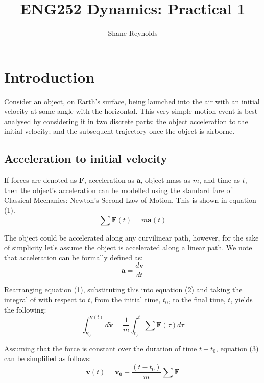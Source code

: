 \documentclass[a4paper]{article}
\begin{document}
\title{ENG252 Dynamics: Practical 1}
\author{Shane Reynolds}
\maketitle

\section{Introduction}
Consider an object, on Earth's surface, being launched into the air with an initial velocity at some angle with the horizontal. This very simple motion event is best analysed by considering it in two discrete parts: the object acceleration to the initial velocity; and the subsequent trajectory once the object is airborne.

\subsection{Acceleration to initial velocity}
If forces are denoted as $\boldsymbol{F}$, acceleration as $\boldsymbol{a}$, object mass as $m$, and time as $t$, then the object's acceleration can be modelled using the standard fare of Classical Mechanics: Newton's Second Law of Motion. This is shown in equation (1).
\begin{equation}
\sum \boldsymbol{F}(t) = m \boldsymbol{a}(t)
\end{equation}

The object could be accelerated along any curvilinear path, however, for the sake of simplicity let's assume the object is accelerated along a linear path. We note that acceleration can be formally defined as:
\begin{equation}
\boldsymbol{a} = \frac{d\boldsymbol{v}}{dt}
\end{equation}

Rearranging equation (1), substituting this into equation (2) and taking the integral of with respect to $t$, from the initial time, $t_0$, to the final time, $t$, yields the following:
\begin{equation}
\int_{\boldsymbol{v_0}}^{\boldsymbol{v}(t)} d\tilde{\boldsymbol{v}} = \frac{1}{m}\int_{t_0}^{t} \sum \boldsymbol{F}(\tau) d\tau
\end{equation}

Assuming that the force is constant over the duration of time $t-t_0$, equation (3) can be simplified as follows:
\begin{equation}
\boldsymbol{v}(t) = \boldsymbol{v_0} + \frac{(t-t_0)}{m} \sum \boldsymbol{F} 
\end{equation}
\end{document}

